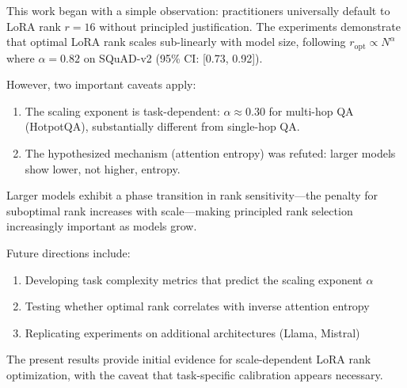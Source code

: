 
This work began with a simple observation: practitioners universally default to LoRA rank $r=16$ without principled justification. The experiments demonstrate that optimal LoRA rank scales sub-linearly with model size, following $r_{\text{opt}} \propto N^{\alpha}$ where $\alpha = 0.82$ on SQuAD-v2 (95\% CI: [0.73, 0.92]).

However, two important caveats apply:

\begin{enumerate}
\item The scaling exponent is task-dependent: $\alpha \approx 0.30$ for multi-hop QA (HotpotQA), substantially different from single-hop QA.
\item The hypothesized mechanism (attention entropy) was refuted: larger models show lower, not higher, entropy.
\end{enumerate}

Larger models exhibit a phase transition in rank sensitivity---the penalty for suboptimal rank increases with scale---making principled rank selection increasingly important as models grow.

Future directions include:
\begin{enumerate}
\item Developing task complexity metrics that predict the scaling exponent $\alpha$
\item Testing whether optimal rank correlates with inverse attention entropy
\item Replicating experiments on additional architectures (Llama, Mistral)
\end{enumerate}

The present results provide initial evidence for scale-dependent LoRA rank optimization, with the caveat that task-specific calibration appears necessary.
